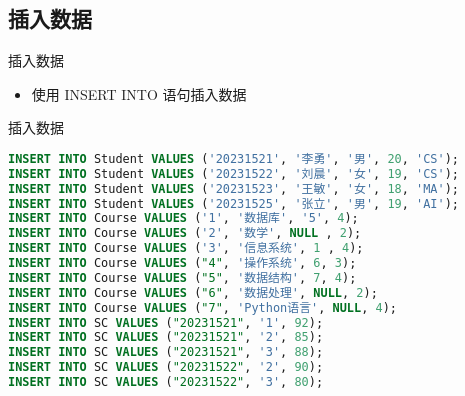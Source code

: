 \subsection{插入数据}
\begin{frame}[fragile]{插入数据}
\begin{itemize}
    \item 使用 INSERT INTO 语句插入数据
\end{itemize}

\begin{block}{插入数据}
\begin{lstlisting}[language=SQL]
INSERT INTO Student VALUES ('20231521', '李勇', '男', 20, 'CS');
INSERT INTO Student VALUES ('20231522', '刘晨', '女', 19, 'CS');
INSERT INTO Student VALUES ('20231523', '王敏', '女', 18, 'MA');
INSERT INTO Student VALUES ('20231525', '张立', '男', 19, 'AI');
INSERT INTO Course VALUES ('1', '数据库', '5', 4);
INSERT INTO Course VALUES ('2', '数学', NULL , 2);
INSERT INTO Course VALUES ('3', '信息系统', 1 , 4);
INSERT INTO Course VALUES ("4", '操作系统', 6, 3);
INSERT INTO Course VALUES ("5", '数据结构', 7, 4);
INSERT INTO Course VALUES ("6", '数据处理', NULL, 2);
INSERT INTO Course VALUES ("7", 'Python语言', NULL, 4);
INSERT INTO SC VALUES ("20231521", '1', 92);
INSERT INTO SC VALUES ("20231521", '2', 85);
INSERT INTO SC VALUES ("20231521", '3', 88);
INSERT INTO SC VALUES ("20231522", '2', 90);
INSERT INTO SC VALUES ("20231522", '3', 80);
\end{lstlisting}
\end{block}
\end{frame}

